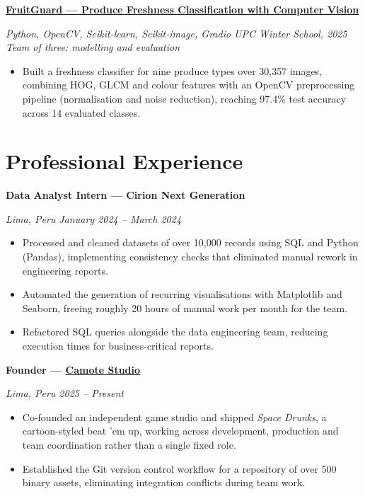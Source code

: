 \documentclass[10pt,letterpaper]{article}
\newcommand{\entry}[2]{%
    \vspace{0.55ex}
    \textbf{#1}\par
    {\small\itshape\color{muted}#2}\par
    \vspace{0.15ex}
}
\newenvironment{points}
{
    \begin{itemize}[
        leftmargin=1.25em,
        itemsep=0.18ex,
        parsep=0pt,
        topsep=0.25ex,
        label=\textbullet
    ]
}
{
    \end{itemize}
}
\begin{document}
\entry
{\href{https://portfolio-ztanq.vercel.app/projects/fruitguard}
{FruitGuard --- Produce Freshness Classification with Computer Vision}}
{Python, OpenCV, Scikit-learn, Scikit-image, Gradio
\textbar{} UPC Winter School, 2025
\textbar{} Team of three: modelling and evaluation}

\begin{points}
    \item Built a freshness classifier for nine produce types over 30,357
    images, combining HOG, GLCM and colour features with an OpenCV preprocessing
    pipeline (normalisation and noise reduction), reaching 97.4\% test accuracy
    across 14 evaluated classes.
\end{points}


\section{Professional Experience}

\entry
{Data Analyst Intern --- Cirion Next Generation}
{Lima, Peru \textbar{} January 2024 -- March 2024}

\begin{points}
    \item Processed and cleaned datasets of over 10,000 records using SQL and
    Python (Pandas), implementing consistency checks that eliminated manual
    rework in engineering reports.

    \item Automated the generation of recurring visualisations with Matplotlib
    and Seaborn, freeing roughly 20 hours of manual work per month for the team.

    \item Refactored SQL queries alongside the data engineering team, reducing
    execution times for business-critical reports.
\end{points}


\entry
{Founder --- \href{https://www.camotestudio.com/}{Camote Studio}}
{Lima, Peru \textbar{} 2025 -- Present}

\begin{points}
    \item Co-founded an independent game studio and shipped \emph{Space Drunks},
    a cartoon-styled beat 'em up, working across development, production and
    team coordination rather than a single fixed role.

    \item Established the Git version control workflow for a repository of over
    500 binary assets, eliminating integration conflicts during team work.
\end{points}
\end{document}
